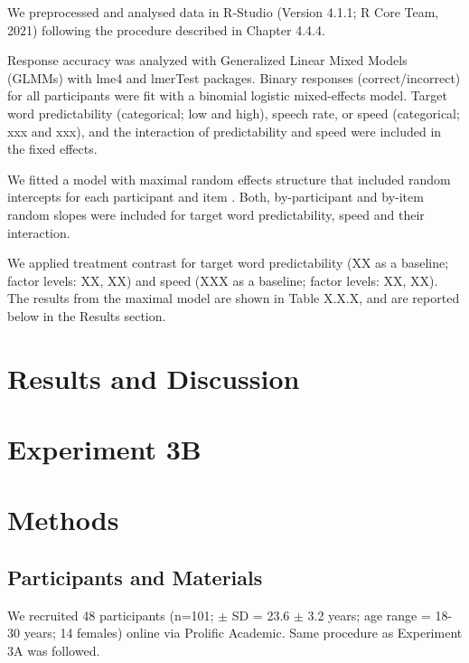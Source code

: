 \documentclass[a4paper, nobind]{templates/ociamthesis}
\begin{document}
We preprocessed and analysed data in R-Studio (Version 4.1.1; R Core Team, 2021) following the procedure described in Chapter 4.4.4.

Response accuracy was analyzed with Generalized Linear Mixed Models (GLMMs) with lme4 \autocite{Bates2015} and lmerTest \autocite{Kuznetsova2017} packages.
Binary responses (correct/incorrect) for all participants were fit with a binomial logistic mixed-effects model\autocite{Jaeger2006,Jaeger2008}.
Target word predictability (categorical; low and high), speech rate, or speed (categorical; xxx and xxx), and the interaction of predictability and speed were included in the fixed effects.

We fitted a model with maximal random effects structure that included random intercepts for each participant and item \autocite{Barr2013}.
Both, by-participant and by-item random slopes were included for target word predictability, speed and their interaction.

We applied treatment contrast for target word predictability (XX as a baseline; factor levels: XX, XX) and speed (XXX as a baseline; factor levels: XX, XX).
The results from the maximal model are shown in Table X.X.X, and are reported below in the Results section.

\hypertarget{results-and-discussion-2}{%
\section{Results and Discussion}\label{results-and-discussion-2}}

\hypertarget{experiment-3b}{%
\section{Experiment 3B}\label{experiment-3b}}

\hypertarget{methods-4}{%
\section{Methods}\label{methods-4}}

\hypertarget{participants-and-materials-1}{%
\subsection{Participants and Materials}\label{participants-and-materials-1}}

We recruited 48 participants (n=101; \(\pm\) SD = 23.6 \(\pm\) 3.2 years; age range = 18-30 years; 14 females) online via Prolific Academic.
Same procedure as Experiment 3A was followed.
\end{document}
